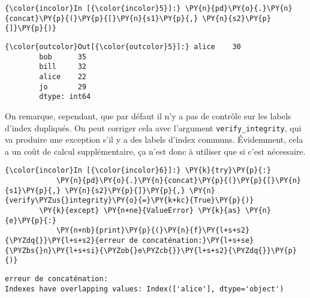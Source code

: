     \begin{Verbatim}[commandchars=\\\{\},frame=single,framerule=0.3mm,rulecolor=\color{cellframecolor}]
{\color{incolor}In [{\color{incolor}5}]:} \PY{n}{pd}\PY{o}{.}\PY{n}{concat}\PY{p}{(}\PY{p}{[}\PY{n}{s1}\PY{p}{,} \PY{n}{s2}\PY{p}{]}\PY{p}{)}
\end{Verbatim}


\begin{Verbatim}[commandchars=\\\{\},frame=single,framerule=0.3mm,rulecolor=\color{cellframecolor}]
{\color{outcolor}Out[{\color{outcolor}5}]:} alice    30
        bob      35
        bill     32
        alice    22
        jo       29
        dtype: int64
\end{Verbatim}
            
    On remarque, cependant, que par défaut il n'y a pas de contrôle sur les
labels d'index dupliqués. On peut corriger cela avec l'argument
\texttt{verify\_integrity}, qui va produire une exception s'il y a des
labels d'index communs. Évidemment, cela a un coût de calcul
supplémentaire, ça n'est donc à utiliser que si c'est nécessaire.

    \begin{Verbatim}[commandchars=\\\{\},frame=single,framerule=0.3mm,rulecolor=\color{cellframecolor}]
{\color{incolor}In [{\color{incolor}6}]:} \PY{k}{try}\PY{p}{:}
            \PY{n}{pd}\PY{o}{.}\PY{n}{concat}\PY{p}{(}\PY{p}{[}\PY{n}{s1}\PY{p}{,} \PY{n}{s2}\PY{p}{]}\PY{p}{,} \PY{n}{verify\PYZus{}integrity}\PY{o}{=}\PY{k+kc}{True}\PY{p}{)}
        \PY{k}{except} \PY{n+ne}{ValueError} \PY{k}{as} \PY{n}{e}\PY{p}{:}
            \PY{n+nb}{print}\PY{p}{(}\PY{n}{f}\PY{l+s+s2}{\PYZdq{}}\PY{l+s+s2}{erreur de concaténation:}\PY{l+s+se}{\PYZbs{}n}\PY{l+s+si}{\PYZob{}e\PYZcb{}}\PY{l+s+s2}{\PYZdq{}}\PY{p}{)}
\end{Verbatim}


    \begin{Verbatim}[commandchars=\\\{\},frame=single,framerule=0.3mm,rulecolor=\color{cellframecolor}]
erreur de concaténation:
Indexes have overlapping values: Index(['alice'], dtype='object')
\end{Verbatim}

